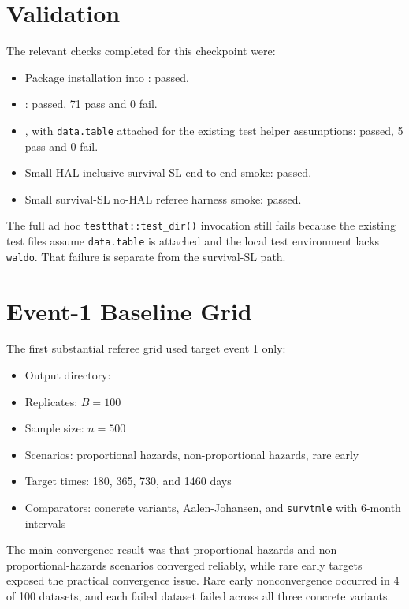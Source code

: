 \documentclass[11pt]{article}
\begin{document}
\section{Validation}

The relevant checks completed for this checkpoint were:

\begin{itemize}
  \item Package installation into : passed.
  \item {}: passed, 71 pass and 0 fail.
  \item {}, with \texttt{data.table} attached for the existing test helper assumptions: passed, 5 pass and 0 fail.
  \item Small HAL-inclusive survival-SL end-to-end smoke: passed.
  \item Small survival-SL no-HAL referee harness smoke: passed.
\end{itemize}

The full ad hoc \texttt{testthat::test\_dir()} invocation still fails because the existing test files assume \texttt{data.table} is attached and the local test environment lacks \texttt{waldo}. That failure is separate from the survival-SL path.

\section{Event-1 Baseline Grid}

The first substantial referee grid used target event 1 only:

\begin{itemize}
  \item Output directory: 
  \item Replicates: \(B = 100\)
  \item Sample size: \(n = 500\)
  \item Scenarios: proportional hazards, non-proportional hazards, rare early
  \item Target times: 180, 365, 730, and 1460 days
  \item Comparators: concrete variants, Aalen-Johansen, and \texttt{survtmle} with 6-month intervals
\end{itemize}

The main convergence result was that proportional-hazards and non-proportional-hazards scenarios converged reliably, while rare early targets exposed the practical convergence issue. Rare early nonconvergence occurred in 4 of 100 datasets, and each failed dataset failed across all three concrete variants.
\end{document}
